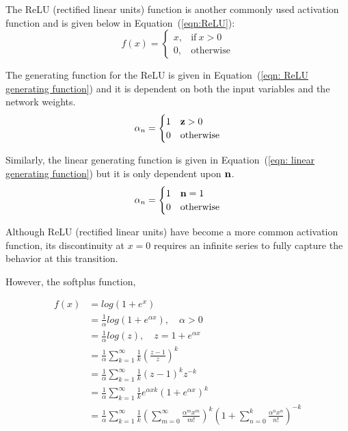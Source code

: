 The ReLU (rectified linear units) function is another commonly used activation function and is given below in Equation~(\ref{eqn:ReLU}):
\begin{equation}
	f(x) =
	\begin{cases}
		x, & \text{if}\ x > 0 \\
		0, & \text{otherwise}
	\end{cases}
	\label{eqn:ReLU}
\end{equation}

The generating function for the ReLU is given in Equation~(\ref{eqn: ReLU generating function}) and it is dependent on both the input variables and the network weights.
\begin{equation}
	\alpha_n =
		\begin{cases}
			1 & \bold z > 0 \\
			0 & \text{otherwise}
		\end{cases}
	\label{eqn: ReLU generating function}
\end{equation}

Similarly, the linear generating function is given in Equation~(\ref{eqn: linear generating function}) but it is only dependent upon $\bold n$.
\begin{equation}
	\alpha_n =
		\begin{cases}
			1 & \bold n = 1 \\
			0 & \text{otherwise}
		\end{cases}
	\label{eqn: linear generating function}
\end{equation}

Although ReLU (rectified linear units) have become a more common activation function, its discontinuity at $x = 0$ requires an infinite series to fully capture the behavior at this transition.

However, the softplus function,

\begin{align*}
	f(x) & = log(1+e^x)\\
	& = \frac{1}{\alpha}log(1+e^{\alpha x}), \quad \alpha > 0 \\
	& = \frac{1}{\alpha}log(z), \quad z = 1 + e^{\alpha x} \\
	& = \frac{1}{\alpha}\sum\limits_{k=1}^\infty
	\frac{1}{k}\left(\frac{z-1}{z}\right)^k \\
	& = \frac{1}{\alpha}\sum\limits_{k=1}^\infty
	\frac{1}{k}(z-1)^{k} z^{-k} \\
	& = \frac{1}{\alpha}\sum\limits_{k=1}^\infty
	\frac{1}{k} e^{\alpha x k} (1 + e^{\alpha x})^{k} \\
	& = \frac{1}{\alpha}\sum\limits_{k=1}^\infty
	\frac{1}{k} \left(\sum\limits_{m=0}^\infty
	\frac{\alpha^{m} x^{m}}{m!}\right)^k \left(1 + \sum\limits_{n=0}^{k} \frac{\alpha^{n} x^{n}}{n!}\right)^{-k}
\end{align*}

